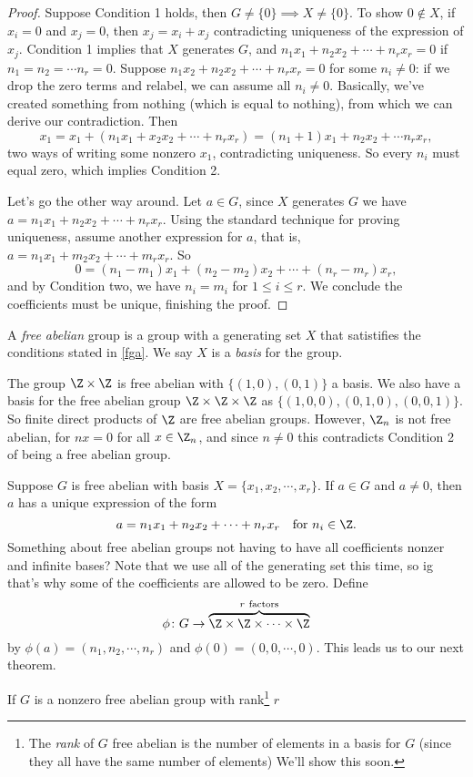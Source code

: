 \begin{proof}
    Suppose Condition 1 holds, then $G\neq \{0\} \implies X\neq \{0\}.$ To show $0\notin X$, if $x_i=0$ and $x_j=0$, then $x_j=x_i+x_j$ contradicting uniqueness of the expression of $x_j$. Condition 1 implies that $X$ generates $G$, and $n_1x_1+n_2x_2+\cdots+n_rx_r=0$ if $n_1=n_2=\cdots n_r=0$. Suppose $n_1x_2+n_2x_2+\cdots+n_rx_r=0$ for some $n_i\neq 0$: if we drop the zero terms and relabel, we can assume all $n_i\neq 0$. Basically, we've created something from nothing (which is equal to nothing), from which we can derive our contradiction. Then 
   \[
       x_1=x_1+(n_1x_1+x_2x_2+\cdots+n_rx_r)=(n_1+1)x_1+n_2x_2+\cdots n_rx_r,
   \] two ways of writing some nonzero $x_1$, contradicting uniqueness. So every $n_i$ must equal zero, which implies Condition 2.

   Let's go the other way around. Let $a\in G$, since $X$ generates $G$ we have $a=n_1x_1+n_2x_2+\cdots+n_rx_r$. Using the standard technique for proving uniqueness, assume another expression for $a $, that is, $a=n_1x_1+m_2x_2+\cdots+m_rx_r$. So \[
       0=(n_1-m_1)x_1+(n_2-m_2)x_2+\cdots+(n_r-m_r)x_r,
   \] and by Condition two, we have $n_i=m_i$ for $1\leq i \leq r$. We conclude the coefficients must be unique, finishing the proof.
\end{proof}
\begin{definition}
    A \emph{free abelian} group is a group with a generating set $X$ that satistifies the conditions stated in \cref{fga}. We say $X$ is a \emph{basis} for the group.
\end{definition}
\begin{example}
    The group $\Z\times \Z$ is free abelian with $\{(1,0),(0,1)\} $ a basis. We also have a basis for the free abelian group $\Z\times \Z\times \Z$ as $\{(1,0,0),(0,1,0),(0,0,1)\} $. So finite direct products of $\Z$ are free abelian groups. However, $\Z_n$ is not free abelian, for $nx=0$ for all $x\in \Z_n$, and since $n\neq 0$ this contradicts Condition 2 of being a free abelian group.
\end{example}
Suppose $G$ is free abelian with basis $X=\{x_1,x_2,\cdots,x_r\} $. If $a\in G$ and $a\neq 0$, then $a$ has a unique expression of the form \[
    a=n_1x_1+n_2x_2+\cdots+n_rx_r\quad \text{for} \ n_i\in \Z.
\] Something about free abelian groups not having to have all coefficients nonzer and infinite bases? Note that we use all of the generating set this time, so ig that's why some of the coefficients are allowed to be zero. Define \[
\phi \colon G \to \overset{r \ \text{factors}}{\overbrace{\Z\times \Z\times \cdots \times \Z}}
\] by $\phi(a)=(n_1,n_2,\cdots,n_r)$ and $\phi(0)=(0,0,\cdots,0)$. This leads us to our next theorem.
\begin{theorem}
    If $G$ is a nonzero free abelian group with rank\footnote{The \emph{rank} of $G$ free abelian is the number of elements in a basis for $G$ (since they all have the same number of elements) We'll show this soon.} $r$
\end{theorem}






